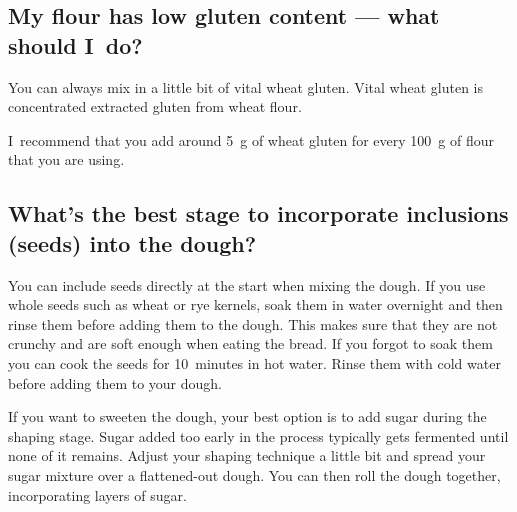 \subsection{My flour has low gluten content --- what should I~do?}

You can always mix in a little bit of vital wheat gluten. Vital wheat gluten
is concentrated extracted gluten from wheat flour.

I~recommend that you add around \qty{5}{\gram} of wheat gluten for every
\qty{100}{\gram} of flour that you are using.

\subsection[Incorporating seeds into the dough]{What's the best stage to
incorporate inclusions (seeds) into the dough?}

You can include seeds directly at the start when mixing the dough. If you use
whole seeds such as wheat or rye kernels, soak them in water overnight and
then rinse them before adding them to the dough. This makes sure that they
are not crunchy and are soft enough when eating the bread. If you forgot to soak
them you can cook the seeds for 10~minutes in hot water. Rinse them with cold
water before adding them to your dough.

If you want to sweeten the dough, your best option is to add sugar during the
shaping stage. Sugar added too early in the process typically gets fermented until none of it
remains. Adjust your shaping technique a little bit and spread your sugar
mixture over a flattened-out dough. You can then roll the dough together,
incorporating layers of sugar.

